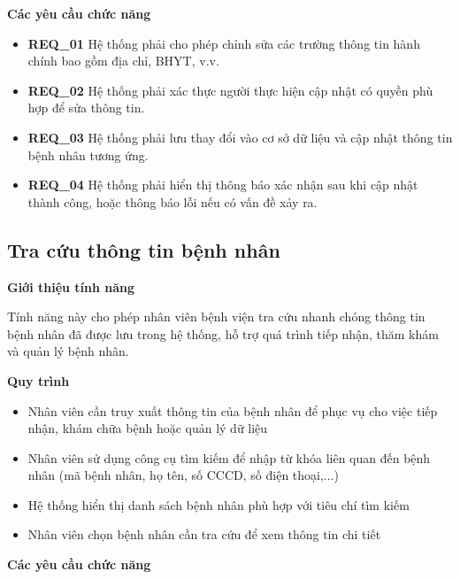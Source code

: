 \noindent \textbf{Các yêu cầu chức năng}

\begin{itemize}

  \item \textbf{REQ\_01} Hệ thống phải cho phép chỉnh sửa các trường thông tin hành chính bao gồm địa chỉ, BHYT, v.v.

  \item \textbf{REQ\_02} Hệ thống phải xác thực người thực hiện cập nhật có quyền phù hợp để sửa thông tin.

  \item \textbf{REQ\_03} Hệ thống phải lưu thay đổi vào cơ sở dữ liệu và cập nhật thông tin bệnh nhân tương ứng.

  \item \textbf{REQ\_04} Hệ thống phải hiển thị thông báo xác nhận sau khi cập nhật thành công, hoặc thông báo lỗi nếu có vấn đề xảy ra.

\end{itemize}

\subsection{Tra cứu thông tin bệnh nhân}

\noindent \textbf{Giới thiệu tính năng}

Tính năng này cho phép nhân viên bệnh viện tra cứu nhanh chóng thông tin bệnh nhân đã được lưu trong hệ thống, hỗ trợ quá trình tiếp nhận, thăm khám và quản lý bệnh nhân.

\noindent \textbf{Quy trình}

\begin{itemize}

  \item Nhân viên cần truy xuất thông tin của bệnh nhân để phục vụ cho việc tiếp nhận, khám chữa bệnh hoặc quản lý dữ liệu

  \item Nhân viên sử dụng công cụ tìm kiếm để nhập từ khóa liên quan đến bệnh nhân (mã bệnh nhân, họ tên, số CCCD, số điện thoại,...)

  \item Hệ thống hiển thị danh sách bệnh nhân phù hợp với tiêu chí tìm kiếm

  \item Nhân viên chọn bệnh nhân cần tra cứu để xem thông tin chi tiết

\end{itemize}

\noindent \textbf{Các yêu cầu chức năng}

